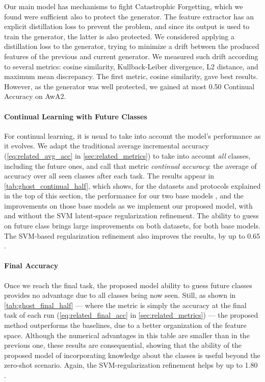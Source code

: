 Our main model has mechanisms to fight Catastrophic Forgetting, which we found were sufficient also
to protect the generator. The feature extractor has an explicit distillation loss to prevent the
problem, and since its output is used to train the generator, the latter is also protected.
We considered applying a distillation loss to the generator, trying to minimize a drift between
the produced features of the previous and current generator. We measured such drift according to
several metrics: cosine similarity, Kullback-Leiber divergence, L2 distance, and maximum mean
discrepancy. The first metric, cosine similarity, gave best results. However, as the generator was
well protected, we gained at most 0.50 Continual Accuracy \pp on AwA2.





\paragraph{Continual Learning with Future Classes}
For continual learning, it is usual to take into account the model's performance as it evolves. We
adapt the traditional average incremental accuracy \citep{rebuffi2017icarl}
(\autoref{eq:related_avg_acc} in \autoref{sec:related_metrics}) to take into account
\textit{all} classes, including the future ones, and call that metric \textit{continual accuracy}:
the average of accuracy over all seen classes after each task. The results appear in
\autoref{tab:ghost_continual_half}, which shows, for the datasets and protocols explained in the top
of this section, the performance for our two base models \citep{hou2019ucir,douillard2020podnet},
and the improvements on those base models as we implement our proposed model, with and without the
SVM latent-space regularization refinement. The ability to guess on future class brings large
improvements on both datasets, for both base models. The SVM-based regularization refinement also
improves the results, by up to 0.65 \pp.



\paragraph{Final Accuracy} Once we reach the final task, the proposed model ability to guess future
classes provides no advantage due to all classes being now seen. Still, as shown in
\autoref{tab:ghost_final_half} — where the metric is simply the accuracy at the final task of each
run (\autoref{eq:related_final_acc} in \autoref{sec:related_metrics}) — the proposed method
outperforms the baselines, due to a better organization of the feature space. Although the numerical
advantages in this table are smaller than in the previous one, these results are consequential,
showing that the ability of the proposed model of incorporating knowledge about the classes is
useful beyond the zero-shot scenario. Again, the SVM-regularization refinement helps by up to 1.80
\pp.


